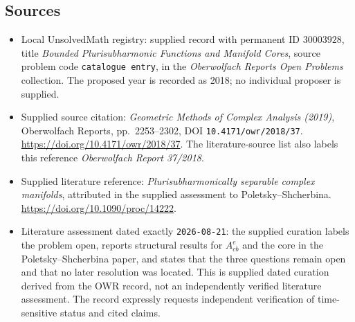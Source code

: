 \documentclass[11pt]{article}
\begin{document}
\subsection{Sources}
\begin{itemize}
\item Local UnsolvedMath registry: supplied record with permanent ID \(30003928\), title \emph{Bounded Plurisubharmonic Functions and Manifold Cores}, source problem code \texttt{catalogue entry}, in the \emph{Oberwolfach Reports Open Problems} collection. The proposed year is recorded as 2018; no individual proposer is supplied.
\item Supplied source citation: \emph{Geometric Methods of Complex Analysis (2019)}, Oberwolfach Reports, pp.\ 2253--2302, DOI \texttt{10.4171/owr/2018/37}. \url{https://doi.org/10.4171/owr/2018/37}. The literature-source list also labels this reference \emph{Oberwolfach Report 37/2018}.
\item Supplied literature reference: \emph{Plurisubharmonically separable complex manifolds}, attributed in the supplied assessment to Poletsky--Shcherbina. \url{https://doi.org/10.1090/proc/14222}.
\item Literature assessment dated exactly \texttt{2026-08-21}: the supplied curation labels the problem open, reports structural results for \(A_{cb}^{e}\) and the core in the Poletsky--Shcherbina paper, and states that the three questions remain open and that no later resolution was located. This is supplied dated curation derived from the OWR record, not an independently verified literature assessment. The record expressly requests independent verification of time-sensitive status and cited claims.
\end{itemize}
\end{document}
